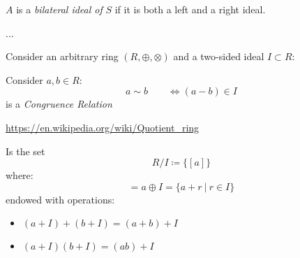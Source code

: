 \documentclass[a4paper,12pt]{scrartcl}    %
\newcommand{\OpA}{\otimes}
\newcommand{\OpB}{\oplus}
\begin{document}
	\begin{definition}
		$A$ is a \emph{bilateral ideal of} $S$ if it is both a left and a right ideal.
	\end{definition}

	\begin{Warning}
		...
	\end{Warning}
	
	Consider an arbitrary ring $(R,\OpB,\OpA)$ and a two-sided ideal $I\subset R$:
	\begin{proposition}
		Consider $a,b \in R$:
		\begin{displaymath}
			a \sim b \qquad \Leftrightarrow (a  - b ) \in I
		\end{displaymath}
		is a \emph{Congruence Relation}
	\end{proposition}
	\url{https://en.wikipedia.org/wiki/Quotient_ring}
	
	\begin{definition}
		Is the set 
		\begin{displaymath}
		 R/I \coloneqq \{ [a]\}
		\end{displaymath}
		where:
		\begin{displaymath}
			[a] = a \OpB I = \{ a + r \: \vert \: r \in I \}
		\end{displaymath}
		endowed with operations:
		\begin{itemize}
			\item $ (a + I) + (b + I) = (a + b) + I $
			\item $ (a + I)(b + I) = (a b) + I$
		\end{itemize}

	
	\end{definition}
\end{document}
